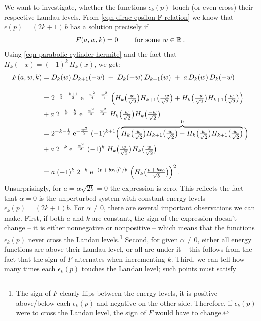 We want to investigate, whether the functions $\epsilon_k(p)$ touch (or even cross) their respective Landau levels. From \eqref{eqn-dirac-epsilon-F-relation} we know that $\epsilon(p) = (2k + 1) \, b$ has a solution precisely if
\begin{equation*}
    F(a, w, k) = 0
    \qquad \text{ for some } w \in \mathbb{R}
    \: .
\end{equation*}
Using \eqref{eqn-parabolic-cylinder-hermite} and the fact that $H_k(-x) = (-1)^k \, H_k(x)$, we get:
\begin{align*}
    F(a, w, k)
    &=
    D_k(w) \, D_{k+1}(-w)
    \;+\; D_k(-w) \, D_{k+1}(w)
    \;+\; a \, D_k(w) \, D_k(-w)
    \\[10pt]
    &= 2^{-\frac{k}{2}-\frac{k+1}{2}} \;
    \mathrm{e}^{-\frac{w^2}{4}-\frac{w^2}{4}} \;
    \Big(
        H_k\big(\tfrac{w}{\sqrt{2}}\big)
        H_{k+1}\big(\tfrac{-w}{\sqrt{2}}\big)
        +
        H_k\big(\tfrac{-w}{\sqrt{2}}\big)
        H_{k+1}\big(\tfrac{w}{\sqrt{2}}\big)
    \Big)
    \\
    &+ a \;
    2^{-\frac{k}{2}-\frac{k}{2}} \;
    \mathrm{e}^{-\frac{w^2}{4}-\frac{w^2}{4}} \;
    H_k\big(\tfrac{w}{\sqrt{2}}\big)
    H_k\big(\tfrac{-w}{\sqrt{2}}\big)
    \\[-5pt]
    &= 2^{-k-\frac{1}{2}} \;
    \mathrm{e}^{-\frac{w^2}{2}} \;
    (-1)^{k+1}
    \Big(
        \overbrace{
            H_k\big(\tfrac{w}{\sqrt{2}}\big)
            H_{k+1}\big(\tfrac{w}{\sqrt{2}}\big)
            -
            H_k\big(\tfrac{w}{\sqrt{2}}\big)
            H_{k+1}\big(\tfrac{w}{\sqrt{2}}\big)
        }^0
    \Big)
    \\
    &+ a \;
    2^{-k} \;
    \mathrm{e}^{-\frac{w^2}{2}} \;
    (-1)^k \;
    H_k\big(\tfrac{w}{\sqrt{2}}\big)
    H_k\big(\tfrac{w}{\sqrt{2}}\big)
    \\[10pt]
    &= a \;
    (-1)^k \;
    2^{-k} \;
    \mathrm{e}^{-( p \, + \, b x_0)^2 / b} \;
    \Big( H_k\big(\tfrac{p \, + \, b x_0}{\sqrt{b}}\big) \Big)^2
    \: .
\end{align*}
Unsurprisingly, for $a = \alpha \sqrt{2b} = 0$ the expression is zero. This reflects the fact that $\alpha = 0$ is the unperturbed system with constant energy levels $\epsilon_k(p) = (2k+1)b$. For $\alpha \neq 0$, there are several important observations we can make. First, if both $a$ and $k$ are constant, the sign of the expression doesn't change – it is either nonnegative or nonpositive – which means that the functions $\epsilon_k(p)$ never cross the Landau levels.\footnote{The sign of $F$ clearly flips between the energy levels, it is positive above/below each $\epsilon_k(p)$ and negative on the other side. Therefore, if $\epsilon_k(p)$ were to cross the Landau level, the sign of $F$ would have to change.} Second, for given $\alpha \neq 0$, either all energy functions are above their Landau level, or all are under it – this follows from the fact that the sign of $F$ alternates when incrementing $k$. Third, we can tell how many times each $\epsilon_k(p)$ touches the Landau level; such points must satisfy
